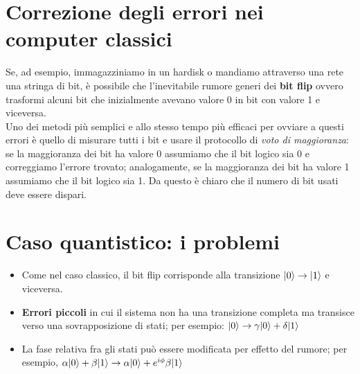 \documentclass[12pt, a4paper]{report}
\begin{document}
\section{Correzione degli errori nei computer classici}
Se, ad esempio, immagazziniamo in un hardisk o mandiamo attraverso una rete una stringa di bit, è possibile che l'inevitabile rumore generi dei \textbf{bit flip} ovvero trasformi alcuni bit che inizialmente avevano valore 0 in bit con valore 1 e viceversa.\\
Uno dei metodi più semplici e allo stesso tempo più efficaci per ovviare a questi errori è quello di  misurare tutti i bit e usare il protocollo di \textit{voto di maggioranza}: se la maggioranza dei bit ha valore 0 assumiamo che il bit logico sia 0 e correggiamo l'errore trovato; analogamente, se la maggioranza dei bit ha valore 1 assumiamo che il bit logico sia 1.
Da questo è chiaro che il numero di bit usati deve essere dispari.
\section{Caso quantistico: i problemi}
\begin{itemize}
    \item Come nel caso classico, il bit flip corrisponde alla transizione $| 0 \rangle\rightarrow| 1 \rangle$ e viceversa.
    \item \textbf{Errori piccoli} in cui il sistema non ha una transizione completa ma transisce verso una sovrapposizione di stati; per esempio: $| 0 \rangle\rightarrow\gamma| 0 \rangle+\delta| 1 \rangle$
    \item La fase relativa fra gli stati può essere modificata per effetto del rumore; per esempio, $\alpha| 0 \rangle+\beta| 1 \rangle\rightarrow\alpha| 0 \rangle+e^{i\phi}\beta| 1 \rangle$
\end{itemize}
\end{document}
